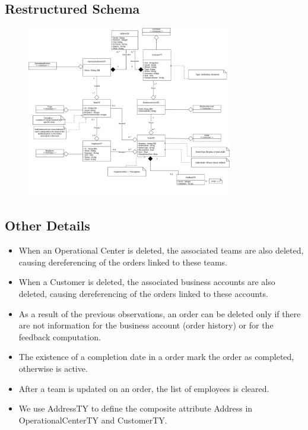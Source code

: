 \subsection*{Restructured Schema}
\begin{figure}[H]
    \centering
    \includegraphics[width=0.8\textwidth]{img/UML.jpg}
\end{figure}

\subsection*{Other Details}
\begin{itemize}[label=-]
    \item When an Operational Center is deleted, the associated teams are also deleted, causing dereferencing of the orders linked to these teams.
    \item When a Customer is deleted, the associated business accounts are also deleted, causing dereferencing of the orders linked to these accounts.
    \item As a result of the previous observations, an order can be deleted only if there are not information for the business account (order history) or for the feedback computation.
    \item The existence of a completion date in a order mark the order as completed, otherwise is active.
    \item After a team is updated on an order, the list of employees is cleared.
    \item We use AddressTY to define the composite attribute Address in OperationalCenterTY and CustomerTY.
\end{itemize}